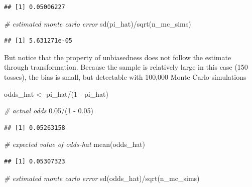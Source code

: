 \documentclass[
]{book}
\newenvironment{Shaded}{\begin{snugshade}}{\end{snugshade}}
\newcommand{\CommentTok}[1]{\textcolor[rgb]{0.56,0.35,0.01}{\textit{#1}}}
\newcommand{\DecValTok}[1]{\textcolor[rgb]{0.00,0.00,0.81}{#1}}
\newcommand{\FloatTok}[1]{\textcolor[rgb]{0.00,0.00,0.81}{#1}}
\newcommand{\FunctionTok}[1]{\textcolor[rgb]{0.00,0.00,0.00}{#1}}
\newcommand{\NormalTok}[1]{#1}
\newcommand{\OtherTok}[1]{\textcolor[rgb]{0.56,0.35,0.01}{#1}}
\newcommand{\SpecialCharTok}[1]{\textcolor[rgb]{0.00,0.00,0.00}{#1}}
\begin{document}
\begin{verbatim}
## [1] 0.05006227
\end{verbatim}

\begin{Shaded}
\begin{Highlighting}[]
\CommentTok{\# estimated monte carlo error}
\FunctionTok{sd}\NormalTok{(pi\_hat)}\SpecialCharTok{/}\FunctionTok{sqrt}\NormalTok{(n\_mc\_sims)}
\end{Highlighting}
\end{Shaded}

\begin{verbatim}
## [1] 5.631271e-05
\end{verbatim}

But notice that the property of unbiasedness does not follow the estimate through transformation. Because the sample is relatively large in this case (150 tosses), the bias is small, but detectable with 100,000 Monte Carlo simulations

\begin{Shaded}
\begin{Highlighting}[]
\NormalTok{odds\_hat }\OtherTok{\textless{}{-}}\NormalTok{ pi\_hat}\SpecialCharTok{/}\NormalTok{(}\DecValTok{1} \SpecialCharTok{{-}}\NormalTok{ pi\_hat)}

\CommentTok{\# actual odds}
\FloatTok{0.05}\SpecialCharTok{/}\NormalTok{(}\DecValTok{1} \SpecialCharTok{{-}} \FloatTok{0.05}\NormalTok{)}
\end{Highlighting}
\end{Shaded}

\begin{verbatim}
## [1] 0.05263158
\end{verbatim}

\begin{Shaded}
\begin{Highlighting}[]
\CommentTok{\# expected value of odds{-}hat}
\FunctionTok{mean}\NormalTok{(odds\_hat)}
\end{Highlighting}
\end{Shaded}

\begin{verbatim}
## [1] 0.05307323
\end{verbatim}

\begin{Shaded}
\begin{Highlighting}[]
\CommentTok{\# estimated monte carlo error}
\FunctionTok{sd}\NormalTok{(odds\_hat)}\SpecialCharTok{/}\FunctionTok{sqrt}\NormalTok{(n\_mc\_sims)}
\end{Highlighting}
\end{Shaded}
\end{document}

